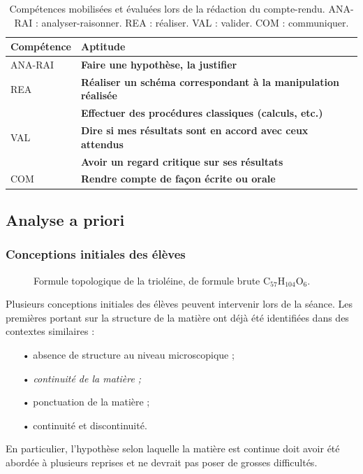 \documentclass[12pt,a4paper]{article}
\newcommand{\rea}{\colorbox{yellow_c}{\textcolor{yellow_f}{REA}}}
\newcommand{\anarai}{\colorbox{green_c}{\textcolor{green_f}{ANA-RAI}}}
\newcommand{\val}{\colorbox{orange_c}{\textcolor{orange_f}{VAL}}}
\newcommand{\com}{\colorbox{red_c}{\textcolor{red_f}{COM}}}
\begin{document}
\begin{table}
\center
\begin{tabular}{l|l}
\textbf{Compétence} & \textbf{Aptitude} \\
\hline \hline
\anarai 	& \textbf{Faire une hypothèse, la justifier} \\
\hline
\rea			& \textbf{Réaliser un schéma correspondant à la manipulation réalisée} \\
				& \textbf{Effectuer des procédures classiques (calculs, etc.)} \\
\hline
\val			& \textbf{Dire si mes résultats sont en accord avec ceux attendus} \\
 				& \textbf{Avoir un regard critique sur ses résultats} \\
\hline
\com		& \textbf{Rendre compte de façon écrite ou orale}
\end{tabular}
\caption{Compétences mobilisées et évaluées lors de la rédaction du compte-rendu.
\anarai{} : analyser-raisonner.
\rea{} : réaliser.
\val{} : valider.
\com{} : communiquer.}
\label{tab:cptces_cr}
\end{table}

\subsection{Analyse a priori}

\subsubsection{Conceptions initiales des élèves}

\begin{figure}
\center
{}
\caption{Formule topologique de la trioléine, de formule brute $\text{C}_\text{57}\text{H}_\text{104}\text{O}_\text{6}$.}
\label{fig:trioleine}
\end{figure}

Plusieurs conceptions initiales des élèves peuvent intervenir lors de la séance.
Les premières portant sur la structure de la matière ont déjà été identifiées dans des contextes similaires \cite{Bain1985} :
\begin{itemize}
\item[•] absence de structure au niveau microscopique ;
\item[•] \emph{continuité de la matière ;}
\item[•] ponctuation de la matière ;
\item[•] continuité et discontinuité.
\end{itemize}
En particulier, l'hypothèse selon laquelle la matière est continue doit avoir été abordée à plusieurs reprises et ne devrait pas poser de grosses difficultés.
\end{document}
